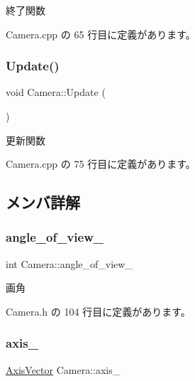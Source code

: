 終了関数 



 Camera.\+cpp の 65 行目に定義があります。

\mbox{\label{class_camera_a4a596a3ea1fdc7d244ba4268031a360b}} 
\subsubsection{\texorpdfstring{Update()}{Update()}}
{\footnotesize\ttfamily void Camera\+::\+Update (\begin{DoxyParamCaption}{ }\end{DoxyParamCaption})}



更新関数 



 Camera.\+cpp の 75 行目に定義があります。



\subsection{メンバ詳解}
\mbox{\label{class_camera_a8c8ccaf83b140c65c458aa5d0077806c}} 
\subsubsection{\texorpdfstring{angle\+\_\+of\+\_\+view\+\_\+}{angle\_of\_view\_}}
{\footnotesize\ttfamily int Camera\+::angle\+\_\+of\+\_\+view\+\_\+\hspace{0.3cm}{\ttfamily [private]}}



画角 



 Camera.\+h の 104 行目に定義があります。

\mbox{\label{class_camera_ad803bf87c68409f7f60836ae8fc25ab0}} 
\subsubsection{\texorpdfstring{axis\+\_\+}{axis\_}}
{\footnotesize\ttfamily \mbox{\hyperlink{class_axis_vector}{Axis\+Vector}} Camera\+::axis\+\_\+\hspace{0.3cm}{\ttfamily [private]}}



